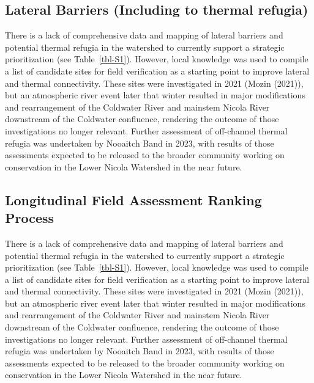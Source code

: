 \documentclass[
  letterpaper,
  DIV=11,
  numbers=noendperiod]{scrreprt}
\begin{document}

\hypertarget{lateral-barriers-including-to-thermal-refugia}{%
\subsection*{Lateral Barriers (Including to thermal
refugia)}\label{lateral-barriers-including-to-thermal-refugia}}

There is a lack of comprehensive data and mapping of lateral barriers
and potential thermal refugia in the watershed to currently support a
strategic prioritization (see Table~\ref{tbl-S1}). However, local
knowledge was used to compile a list of candidate sites for field
verification as a starting point to improve lateral and thermal
connectivity. These sites were investigated in 2021 (Mozin (2021)), but
an atmospheric river event later that winter resulted in major
modifications and rearrangement of the Coldwater River and mainstem
Nicola River downstream of the Coldwater confluence, rendering the
outcome of those investigations no longer relevant. Further assessment
of off-channel thermal refugia was undertaken by Nooaitch Band in 2023,
with results of those assessments expected to be released to the broader
community working on conservation in the Lower Nicola Watershed in the
near future.

\hypertarget{longitudinal-field-assessment-ranking-process}{%
\subsection*{Longitudinal Field Assessment Ranking
Process}\label{longitudinal-field-assessment-ranking-process}}

There is a lack of comprehensive data and mapping of lateral barriers
and potential thermal refugia in the watershed to currently support a
strategic prioritization (see Table~\ref{tbl-S1}). However, local
knowledge was used to compile a list of candidate sites for field
verification as a starting point to improve lateral and thermal
connectivity. These sites were investigated in 2021 (Mozin (2021)), but
an atmospheric river event later that winter resulted in major
modifications and rearrangement of the Coldwater River and mainstem
Nicola River downstream of the Coldwater confluence, rendering the
outcome of those investigations no longer relevant. Further assessment
of off-channel thermal refugia was undertaken by Nooaitch Band in 2023,
with results of those assessments expected to be released to the broader
community working on conservation in the Lower Nicola Watershed in the
near future.
\end{document}
